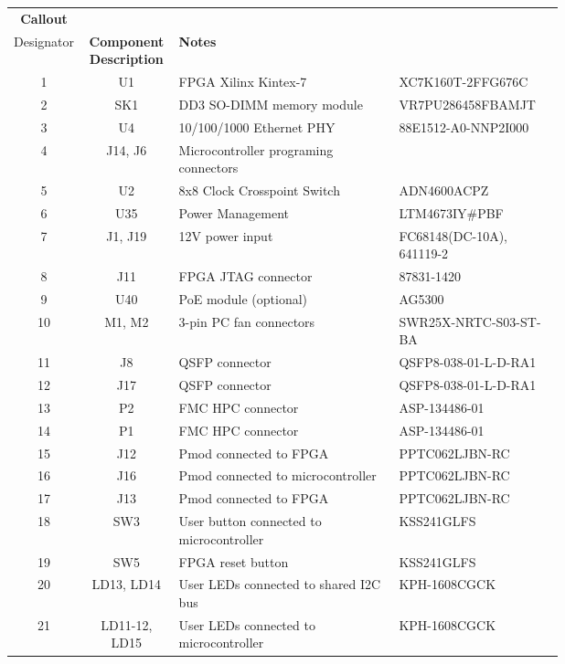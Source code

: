 \documentclass[12pt,oneside,a4]{article}
\begin{document}
\begin{longtable}[htbp]{@{}ccp{0.4\linewidth}p{0.3\linewidth}}
\toprule
\textbf{Callout} &
  \textbf{\begin{tabular}[c]{@{}c@{}}Reference\\ Designator\end{tabular}} &
  \textbf{Component Description} &
  \textbf{Notes} \\ \midrule
1  & U1  & FPGA Xilinx Kintex-7      & XC7K160T-2FFG676C \\
2  & SK1 & DD3 SO-DIMM memory module & VR7PU286458FBAMJT \\
3  & U4  & 10/100/1000 Ethernet PHY  & 88E1512-A0-NNP2I000  \\
4  & J14, J6 & Microcontroller programing connectors         &                   \\
5  & U2  & 8x8 Clock Crosspoint Switch   & ADN4600ACPZ     \\
6  & U35 & Power Management          & LTM4673IY\#PBF   \\
7  & J1, J19 & 12V power input       & FC68148(DC-10A), 641119-2  \\
8  & J11 & FPGA JTAG connector       & 87831-1420   \\
9  & U40 & PoE module (optional)     & AG5300          \\
10 & M1, M2 & 3-pin PC fan connectors & SWR25X-NRTC-S03-ST-BA \\
11 & J8  & QSFP connector            & QSFP8-038-01-L-D-RA1 \\
12 & J17 & QSFP connector            & QSFP8-038-01-L-D-RA1   \\
13 & P2  & FMC HPC connector         & ASP-134486-01 \\
14 & P1  & FMC HPC connector         & ASP-134486-01     \\
15 & J12 & Pmod connected to FPGA    & PPTC062LJBN-RC     \\
16 & J16 & Pmod connected to microcontroller  & PPTC062LJBN-RC    \\
17 & J13 & Pmod connected to FPGA    & PPTC062LJBN-RC    \\
18 & SW3 & User button connected to microcontroller      &  KSS241GLFS  \\
19 & SW5 & FPGA reset button         & KSS241GLFS      \\
20 & LD13, LD14 & User LEDs connected to shared I2C bus & KPH-1608CGCK \\
21 & LD11-12, LD15 & User LEDs connected to microcontroller &  KPH-1608CGCK  \\

\end{longtable}
\end{document}
